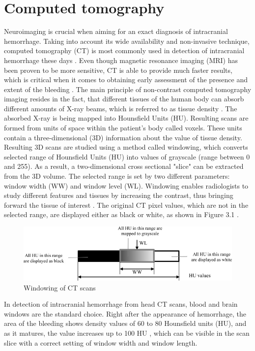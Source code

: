\section{Computed tomography}
Neuroimaging is crucial when aiming for an exact diagnosis of intracranial hemorrhage.  Taking into account its wide availability and non-invasive technique, computed tomography (CT) is most commonly used in detection of intracranial hemorrhage these days \cite{imagingICH}. Even though magnetic resonance imaging (MRI) has been proven to be more sensitive, CT is able to provide much faster results, which is critical when it comes to obtaining early assessment of the presence and extent of the bleeding \cite{imagingAfterBrainInjury}. The main principle of non-contrast computed tomography imaging resides in the fact, that different tissues of the human body can absorb different amounts of X-ray beams, which is referred to as tissue density \cite{principlesOfCT}. The absorbed X-ray is being mapped into Hounsfield Units (HU). Resulting scans are formed from units of space within the patient's body called voxels. These units contain a three-dimensional (3D) information about the value of tissue density. Resulting 3D scans are studied using a method called windowing, which converts selected range of Hounsfield Units (HU) into values of grayscale (range between 0 and 255).  As a result, a two-dimensional cross sectional "slice" can be extracted from the 3D volume. The selected range is set by two different parameters: window width (WW) and window level (WL). Windowing enables radiologists to study different features and tissues by increasing the contrast, thus bringing forward the tissue of interest \cite{windowClassBiomArt}. The original CT pixel values, which are not in the selected range, are displayed either as black or white, as shown in Figure 3.1 .

\begin{figure}[h]
\begin{centering}
\includegraphics[width=15cm]{assets/images/windowingHU}
\par\end{centering}
\caption{Windowing of CT scans \cite{windowClassBiomArt}
\label{fig:windowing}}
\end{figure}

In detection of intracranial hemorrhage from head CT scans, blood and brain windows are the standard choice. Right after the appearance of hemorrhage, the area of the bleeding shows density values of 60 to 80 Hounsfield units (HU), and as it matures, the value increases up to 100 HU  \cite{principlesOfCT}, which can be visible in the scan slice with a correct setting of window width and window length.